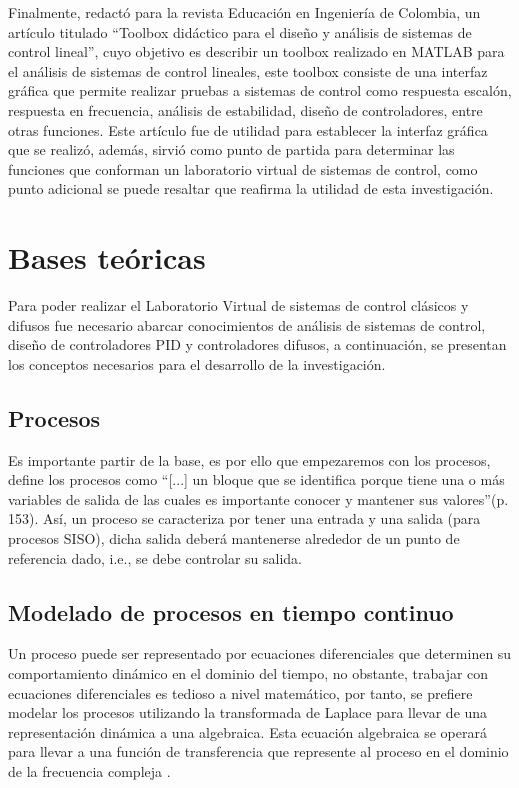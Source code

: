     Finalmente, \textcite{cadavid2009toolbox} redactó para la revista Educación en Ingeniería de Colombia, un artículo titulado \enquote{Toolbox didáctico para el diseño y análisis de sistemas de control lineal}, cuyo objetivo es describir un toolbox realizado en MATLAB para el análisis de sistemas de control lineales, este toolbox consiste de una interfaz gráfica que permite realizar pruebas a sistemas de control como respuesta escalón, respuesta en frecuencia, análisis de estabilidad, diseño de controladores, entre otras funciones. Este artículo fue de utilidad para establecer la interfaz gráfica que se realizó, además, sirvió como punto de partida para determinar las funciones que conforman un laboratorio virtual de sistemas de control, como punto adicional se puede resaltar que reafirma la utilidad de esta investigación.

\section{Bases teóricas}
	
    Para poder realizar el Laboratorio Virtual de sistemas de control clásicos y difusos fue necesario abarcar conocimientos de análisis de sistemas de control, diseño de controladores PID y controladores difusos, a continuación, se presentan los conceptos necesarios para el desarrollo de la investigación.
    
    \subsection{Procesos}
		
        Es importante partir de la base, es por ello que empezaremos con los procesos, \textcite{sanchez2003control} define los procesos como \enquote{[...] un bloque que se identifica porque tiene una o más variables de salida de las cuales es importante conocer y mantener sus valores}(p.$\,$153). Así, un proceso se caracteriza por tener una entrada y una salida (para procesos SISO), dicha salida deberá mantenerse alrededor de un punto de referencia dado, i.e., se debe controlar su salida.
	
	\subsection{Modelado de procesos en tiempo continuo}
	
		Un proceso puede ser representado por ecuaciones diferenciales que determinen su comportamiento dinámico en el dominio del tiempo, no obstante, trabajar con ecuaciones diferenciales es tedioso a nivel matemático, por tanto, se prefiere modelar los procesos utilizando la transformada de Laplace para llevar de una representación dinámica a una algebraica. Esta ecuación algebraica se operará para llevar a una función de transferencia que represente al proceso en el dominio de la frecuencia compleja \Parencite{smith1985principles}.
	
